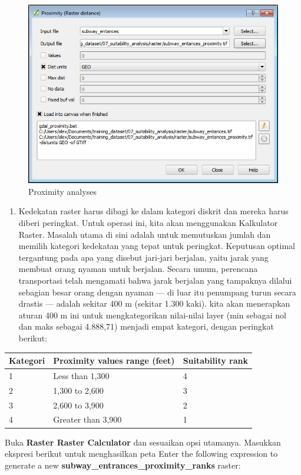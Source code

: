 \documentclass[]{book}
\providecommand{\tightlist}{%
  \setlength{\itemsep}{0pt}\setlength{\parskip}{0pt}}
\begin{document}
\begin{figure}

{\centering \includegraphics[width=0.7\linewidth]{images/04/fig38} 

}

\caption{Proximity analyses}\label{fig:fig1438}
\end{figure}

\begin{enumerate}
\def\labelenumi{\arabic{enumi}.}
\setcounter{enumi}{2}
\tightlist
\item
  Kedekatan raster harus dibagi ke dalam kategori diskrit dan mereka harus diberi peringkat. Untuk operasi ini, kita akan menggunakan Kalkulator Raster. Masalah utama di sini adalah untuk memutuskan jumlah dan memilih kategori kedekatan yang tepat untuk peringkat. Keputusan optimal tergantung pada apa yang disebut jari-jari berjalan, yaitu jarak yang membuat orang nyaman untuk berjalan. Secara umum, perencana transportasi telah mengamati bahwa jarak berjalan yang tampaknya dilalui sebagian besar orang dengan nyaman --- di luar itu penumpang turun secara drastis --- adalah sekitar 400 m (sekitar 1.300 kaki). kita akan menerapkan aturan 400 m ini untuk mengkategorikan nilai-nilai layer (min sebagai nol dan maks sebagai 4.888,71) menjadi empat kategori, dengan peringkat berikut:
\end{enumerate}

\begin{longtable}[]{@{}lll@{}}
\toprule
Kategori & Proximity values range (feet) & Suitability rank\tabularnewline
\midrule
\endhead
1 & Less than 1,300 & 4\tabularnewline
2 & 1,300 to 2,600 & 3\tabularnewline
3 & 2,600 to 3,900 & 2\tabularnewline
4 & Greater than 3,900 & 1\tabularnewline
\bottomrule
\end{longtable}

Buka \textbf{Raster \textbar{} Raster Calculator} dan sesuaikan opsi utamanya. Masukkan ekspresi berikut untuk menghasilkan peta Enter the following expression to generate a new \textbf{subway\_entrances\_proximity\_ranks} raster:
\end{document}
